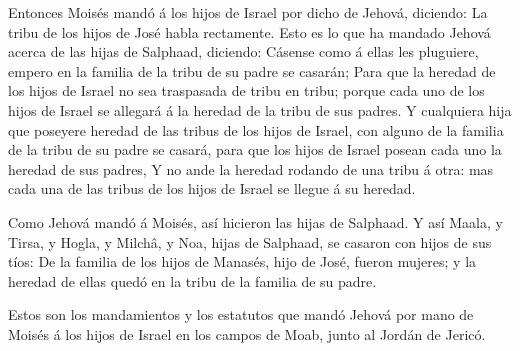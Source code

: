  Entonces Moisés mandó á los hijos de Israel por dicho de
Jehová, diciendo: La tribu de los hijos de José habla rectamente.
 Esto es lo que ha mandado Jehová acerca de las hijas de
Salphaad, diciendo: Cásense como á ellas les pluguiere, empero en la
familia de la tribu de su padre se casarán;  Para que la
heredad de los hijos de Israel no sea traspasada de tribu en tribu;
porque cada uno de los hijos de Israel se allegará á la heredad de la
tribu de sus padres.  Y cualquiera hija que poseyere heredad
de las tribus de los hijos de Israel, con alguno de la familia de la
tribu de su padre se casará, para que los hijos de Israel posean cada
uno la heredad de sus padres,  Y no ande la heredad rodando
de una tribu á otra: mas cada una de las tribus de los hijos de Israel
se llegue á su heredad.

 Como Jehová mandó á Moisés, así hicieron las hijas de
Salphaad.  Y así Maala, y Tirsa, y Hogla, y Milchâ, y Noa,
hijas de Salphaad, se casaron con hijos de sus tíos:  De la
familia de los hijos de Manasés, hijo de José, fueron mujeres; y la
heredad de ellas quedó en la tribu de la familia de su padre.

 Estos son los mandamientos y los estatutos que mandó
Jehová por mano de Moisés á los hijos de Israel en los campos de Moab,
junto al Jordán de Jericó.
